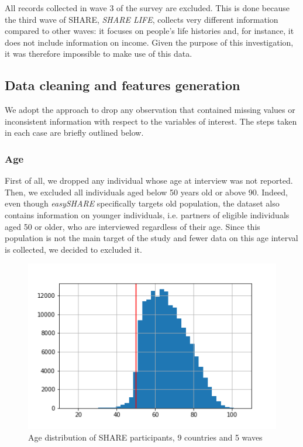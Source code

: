\documentclass[\main/main.tex]{subfiles}
\begin{document}
All records collected in wave 3 of the survey are excluded. This is done because the third wave of SHARE, \textit{SHARE LIFE}, collects very different information compared to other waves: it focuses on people's life histories and, for instance, it does not include information on income. Given the purpose of this investigation, it was therefore impossible to make use of this data.

\subsection{Data cleaning and features generation}

We adopt the approach to drop any observation that contained missing values or inconsistent information with respect to the variables of interest.
The steps taken in each case are briefly outlined below.

\subsubsection{Age}
First of all, we dropped any individual whose age at interview was not reported. Then, we excluded all individuals aged below 50 years old or above 90.
Indeed, even though \textit{easySHARE} specifically targets old population,  the dataset  also  contains  information on  younger  individuals,  i.e.   partners  of  eligible  individuals  aged  50  or  older,  who  are interviewed regardless of their age. Since this population is not the main target of the study and fewer data on this age interval is collected, we decided to excluded it. 
\begin{figure}[H] 
    \centering
    \includegraphics[scale=.5]{images/age_distribution.png}
    \caption{Age distribution of SHARE participants, 9 countries and 5 waves}
\label{fig:age_distribution}
\end{figure}
\end{document}
